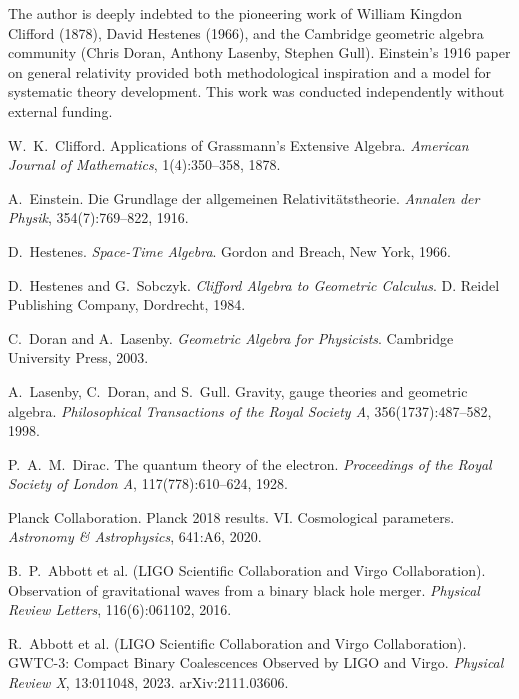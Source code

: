 \documentclass[11pt,a4paper]{article}
\numberwithin{equation}{section}
\theoremstyle{plain}
\theoremstyle{definition}
\theoremstyle{remark}
\begin{document}
The author is deeply indebted to the pioneering work of William Kingdon Clifford (1878), David Hestenes (1966), and the Cambridge geometric algebra community (Chris Doran, Anthony Lasenby, Stephen Gull). Einstein's 1916 paper on general relativity provided both methodological inspiration and a model for systematic theory development. This work was conducted independently without external funding.

\begin{thebibliography}{99}

W.~K.~Clifford.
\newblock Applications of Grassmann's Extensive Algebra.
\newblock \emph{American Journal of Mathematics}, 1(4):350--358, 1878.

A.~Einstein.
\newblock Die Grundlage der allgemeinen Relativitätstheorie.
\newblock \emph{Annalen der Physik}, 354(7):769--822, 1916.

D.~Hestenes.
\newblock \emph{Space-Time Algebra}.
\newblock Gordon and Breach, New York, 1966.

D.~Hestenes and G.~Sobczyk.
\newblock \emph{Clifford Algebra to Geometric Calculus}.
\newblock D. Reidel Publishing Company, Dordrecht, 1984.

C.~Doran and A.~Lasenby.
\newblock \emph{Geometric Algebra for Physicists}.
\newblock Cambridge University Press, 2003.

A.~Lasenby, C.~Doran, and S.~Gull.
\newblock Gravity, gauge theories and geometric algebra.
\newblock \emph{Philosophical Transactions of the Royal Society A}, 356(1737):487--582, 1998.

P.~A.~M.~Dirac.
\newblock The quantum theory of the electron.
\newblock \emph{Proceedings of the Royal Society of London A}, 117(778):610--624, 1928.

Planck Collaboration.
\newblock Planck 2018 results. VI. Cosmological parameters.
\newblock \emph{Astronomy \& Astrophysics}, 641:A6, 2020.

B.~P.~Abbott et al. (LIGO Scientific Collaboration and Virgo Collaboration).
\newblock Observation of gravitational waves from a binary black hole merger.
\newblock \emph{Physical Review Letters}, 116(6):061102, 2016.

R.~Abbott et al. (LIGO Scientific Collaboration and Virgo Collaboration).
\newblock GWTC-3: Compact Binary Coalescences Observed by LIGO and Virgo.
\newblock \emph{Physical Review X}, 13:011048, 2023. arXiv:2111.03606.


\end{thebibliography}
\end{document}
